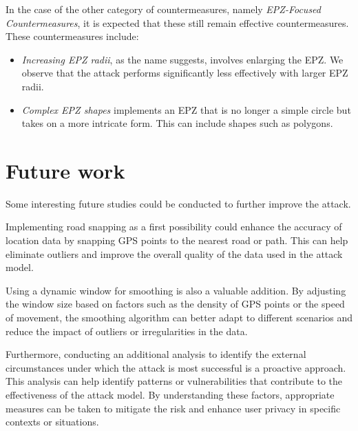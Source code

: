 \documentclass[conference]{IEEEtran}
\begin{document}
In the case of the other category of countermeasures, namely
\textit{EPZ-Focused Countermeasures}, it is expected that these still remain
effective countermeasures. These countermeasures include: \begin{itemize}
    \item \textit{Increasing EPZ radii}, as the name suggests, involves enlarging the EPZ. We
          observe that the attack performs significantly less effectively with larger EPZ
          radii.
    \item \textit{Complex EPZ shapes} implements an EPZ that  is no longer a simple circle but takes on
          a more intricate form. This can include shapes such as polygons.
\end{itemize}

\section{\textbf{Future work}}
Some interesting future studies could be conducted to further improve the attack.

Implementing road snapping as a first possibility could enhance the accuracy of
location data by snapping GPS points to the nearest road or path. This can help
eliminate outliers and improve the overall quality of the data used in the
attack model.

Using a dynamic window for smoothing is also a valuable addition. By adjusting
the window size based on factors such as the density of GPS points or the speed
of movement, the smoothing algorithm can better adapt to different scenarios
and reduce the impact of outliers or irregularities in the data.

Furthermore, conducting an additional analysis to identify the external
circumstances under which the attack is most successful is a proactive
approach. This analysis can help identify patterns or vulnerabilities that
contribute to the effectiveness of the attack model. By understanding these
factors, appropriate measures can be taken to mitigate the risk and enhance
user privacy in specific contexts or situations.




\onecolumn
\appendix
\end{document}
